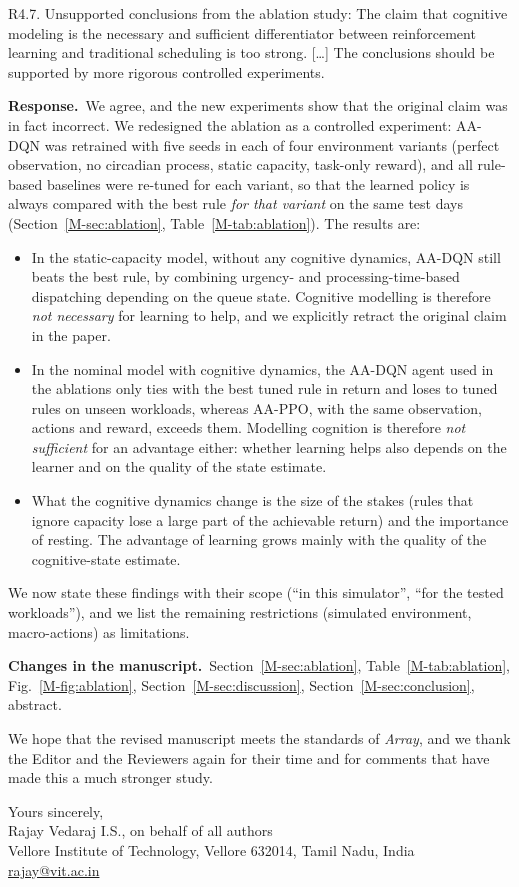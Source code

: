 \documentclass[11pt]{article}
\newcommand{\resp}{\par\smallskip\noindent\textbf{Response.}~}
\newcommand{\change}{\par\smallskip\noindent\textbf{Changes in the manuscript.}~}
\newcommand{\Sec}[1]{Section~\ref{M-#1}}
\newcommand{\Tab}[1]{Table~\ref{M-#1}}
\newcommand{\Fig}[1]{Fig.~\ref{M-#1}}
\begin{document}
\begin{rcomment}{R4.7.}
Unsupported conclusions from the ablation study: The claim that cognitive modeling is the necessary and sufficient differentiator between reinforcement learning and traditional scheduling is too strong. [\dots] The conclusions should be supported by more rigorous controlled experiments.
\end{rcomment}
\resp We agree, and the new experiments show that the original claim was in fact incorrect. We redesigned the ablation as a controlled experiment: AA-DQN was retrained with five seeds in each of four environment variants (perfect observation, no circadian process, static capacity, task-only reward), and all rule-based baselines were re-tuned for each variant, so that the learned policy is always compared with the best rule \emph{for that variant} on the same test days (\Sec{sec:ablation}, \Tab{tab:ablation}). The results are:
\begin{itemize}
\item In the static-capacity model, without any cognitive dynamics, AA-DQN still beats the best rule, by combining urgency- and processing-time-based dispatching depending on the queue state. Cognitive modelling is therefore \emph{not necessary} for learning to help, and we explicitly retract the original claim in the paper.
\item In the nominal model with cognitive dynamics, the AA-DQN agent used in the ablations only ties with the best tuned rule in return and loses to tuned rules on unseen workloads, whereas AA-PPO, with the same observation, actions and reward, exceeds them. Modelling cognition is therefore \emph{not sufficient} for an advantage either: whether learning helps also depends on the learner and on the quality of the state estimate.
\item What the cognitive dynamics change is the size of the stakes (rules that ignore capacity lose a large part of the achievable return) and the importance of resting. The advantage of learning grows mainly with the quality of the cognitive-state estimate.
\end{itemize}
We now state these findings with their scope (``in this simulator'', ``for the tested workloads''), and we list the remaining restrictions (simulated environment, macro-actions) as limitations.
\change \Sec{sec:ablation}, \Tab{tab:ablation}, \Fig{fig:ablation}, \Sec{sec:discussion}, \Sec{sec:conclusion}, abstract.

\bigskip
\noindent We hope that the revised manuscript meets the standards of \emph{Array}, and we thank the Editor and the Reviewers again for their time and for comments that have made this a much stronger study.

\medskip
\noindent Yours sincerely,\\
Rajay Vedaraj I.S., on behalf of all authors\\
Vellore Institute of Technology, Vellore 632014, Tamil Nadu, India\\
\href{mailto:rajay@vit.ac.in}{rajay@vit.ac.in}
\end{document}
